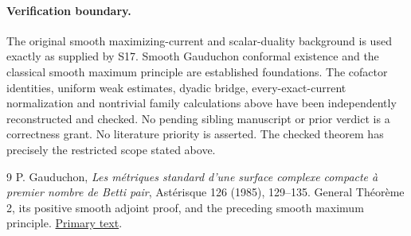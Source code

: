 \documentclass[11pt]{article}
\theoremstyle{remark}\newtheorem{remark}[theorem]{Remark}
\begin{document}
\paragraph{Verification boundary.}
The original smooth maximizing-current and scalar-duality background
is used exactly as supplied by S17. Smooth Gauduchon conformal
existence and the classical smooth maximum principle are established
foundations. The cofactor identities, uniform weak estimates,
dyadic bridge, every-exact-current normalization and nontrivial
family calculations above have been independently reconstructed and
checked. No pending sibling manuscript or prior
verdict is a correctness grant. No literature priority is asserted.
The checked theorem has precisely the restricted scope stated above.

\begin{thebibliography}{9}
 P. Gauduchon,
\emph{Les m\'etriques standard d'une surface complexe compacte
\`a premier nombre de Betti pair}, Ast\'erisque 126 (1985), 129--135.
General Th\'eor\`eme 2, its positive smooth adjoint proof,
and the preceding smooth maximum principle.
\href{https://www.numdam.org/article/AST_1985__126__129_0.pdf}{Primary text}.
\end{thebibliography}
\end{document}
